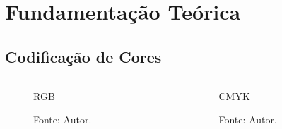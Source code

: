 \section{Fundamentação Teórica}

\subsection{Codificação de Cores}
\begin{frame}
    \begin{columns}
        \begin{column}{0.5\textwidth}
            \begin{figure}
                \centering
                \caption*{RGB}
                
                \caption*{Fonte: Autor.}
            \end{figure}
        \end{column}
        \begin{column}{0.5\textwidth}
            \begin{figure}
                \centering
                \caption*{CMYK}
                
                \caption*{Fonte: Autor.}
            \end{figure}
        \end{column}
    \end{columns}
\end{frame}

